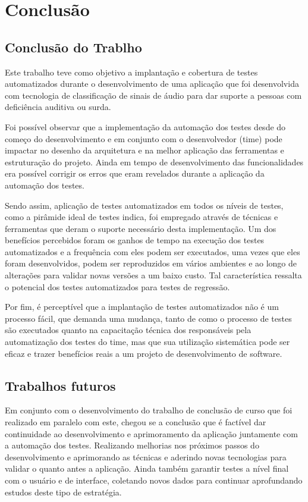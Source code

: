 \chapter{Conclusão}



\section{Conclusão do Trablho}

Este trabalho teve como objetivo a implantação e cobertura de testes automatizados durante o desenvolvimento de uma aplicação que foi desenvolvida com tecnologia de classificação de sinais de áudio para dar suporte a pessoas com deficiência auditiva ou surda.

Foi possível observar que a implementação da automação dos testes desde do começo do desenvolvimento e em conjunto com o desenvolvedor (time) pode impactar no desenho da arquitetura e na melhor aplicação das ferramentas e estruturação do projeto. Ainda em tempo de desenvolvimento das funcionalidades era possível corrigir os erros que eram revelados durante a aplicação da automação dos testes.

Sendo assim, aplicação de testes automatizados em todos os níveis de testes, como a pirâmide ideal de testes indica, foi empregado através de técnicas e ferramentas que deram o suporte necessário desta implementação. Um dos benefícios percebidos foram os ganhos de tempo na execução dos testes automatizados e a frequência com eles podem ser executados, uma vezes que eles foram desenvolvidos, podem ser reproduzidos em vários ambientes e ao longo de alterações para validar novas versões a um baixo custo. Tal característica ressalta o potencial dos testes automatizados para testes de regressão.

Por fim,  é perceptível que a implantação de testes automatizados não é um processo fácil, que demanda uma mudança, tanto de como o processo de testes são executados quanto na capacitação  técnica dos responsáveis pela automatização dos testes do time, mas que sua utilização sistemática pode ser eficaz e trazer benefícios reais a um projeto de desenvolvimento de software. 


\section{Trabalhos futuros}

Em conjunto com o desenvolvimento do trabalho de conclusão de curso que foi realizado em paralelo com este, chegou se a conclusão que é factível dar continuidade ao desenvolvimento e aprimoramento da aplicação juntamente com a automação dos testes. Realizando melhorias nos próximos passos do desenvolvimento e aprimorando as técnicas e aderindo novas tecnologias para validar o quanto antes a aplicação. Ainda também garantir testes a nível final com o usuário e de interface, coletando novos dados para continuar aprofundando estudos deste tipo de estratégia.
